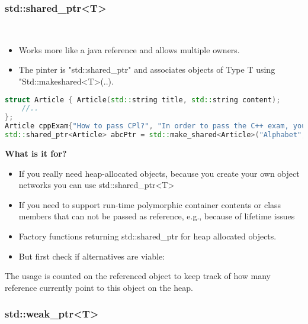 \subsubsection{std::shared\_ptr<T>}
\begin{itemize}
  \itemsep -0.5em 
  \item Works more like a java reference and allows multiple owners.
  \item The pinter is "std::shared\_ptr" and associates objects of Type T using "Std::makeshared<T>(..).
\end{itemize}

\begin{lstlisting}[language=C++]
struct Article { Article(std::string title, std::string content);
	//..
};
Article cppExam{"How to pass CPl?", "In order to pass the C++ exam, you have to..."};
std::shared_ptr<Article> abcPtr = std::make_shared<Article>("Alphabet", "ABCDEFGHIJKLMNOPQRSTUVXYZ");
\end{lstlisting}

\textbf{What is it for?}
\begin{itemize}
  \itemsep 0em 
  \item If you really need heap-allocated objects, because you create your own object networks you can use std::shared\_ptr<T> 
  \item  If you need to support run-time polymorphic container contents or class members that can not be passed as reference, e.g., because of lifetime issues 
  \item Factory functions returning std::shared\_ptr for heap allocated objects.
  \item  But first check if alternatives are viable:
\end{itemize}

The usage is counted on the referenced object to keep track of how many reference currently point to this object on the heap.

\subsubsection{std::weak\_ptr<T>}






